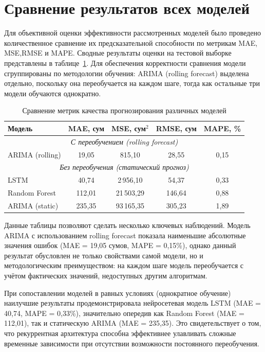 \section{Сравнение результатов всех моделей}
Для объективной оценки эффективности рассмотренных моделей было проведено количественное сравнение их предсказательной способности по метрикам MAE, MSE,RMSE и MAPE. Сводные результаты оценки на тестовой выборке представлены в таблице~\ref{tab:models_comparison}. Для обеспечения корректности сравнения модели сгруппированы по методологии обучения: ARIMA (rolling forecast) выделена отдельно, поскольку она переобучается на каждом шаге, тогда как остальные три модели обучаются однократно.
\begin{table}[h!]
\centering
\caption{Сравнение метрик качества прогнозирования различных моделей}
\label{tab:models_comparison}
\begin{tabular}{|l|c|c|c|c|}
\hline
\textbf{Модель} & \textbf{MAE, сум} & \textbf{MSE, сум$^2$} & \textbf{RMSE, сум} & \textbf{MAPE, \%} \\ \hline
\multicolumn{5}{|c|}{\textit{С переобучением (rolling forecast)}} \\ \hline
ARIMA (rolling) & 19{,}05 & 815{,}10 & 28{,}55 & 0{,}15 \\ \hline
\multicolumn{5}{|c|}{\textit{Без переобучения (статический прогноз)}} \\ \hline
LSTM            & 40{,}74 & 2\,956{,}10 & 54{,}37 & 0{,}33 \\ \hline
Random Forest   & 112{,}01 & 21\,503{,}29 & 146{,}64 & 0{,}88 \\ \hline
ARIMA (static)  & 235{,}35 & 93\,165{,}35 & 305{,}23 & 1{,}89 \\ \hline
\end{tabular}
\end{table}

Данные таблицы позволяют сделать несколько ключевых наблюдений. Модель ARIMA с использованием rolling forecast показала наименьшие абсолютные значения ошибок (MAE = 19,05 сумов, MAPE = 0,15\%), однако данный результат обусловлен не только свойствами самой модели, но и методологическим преимуществом: на каждом шаге модель переобучается с учётом фактических значений, недоступных другим алгоритмам.

При сопоставлении моделей в равных условиях (однократное обучение) наилучшие результаты продемонстрировала нейросетевая модель LSTM (MAE = 40,74, MAPE = 0,33\%), значительно опередив как Random Forest (MAE = 112,01), так и статическую ARIMA (MAE = 235,35). Это свидетельствует о том, что рекуррентная архитектура способна эффективнее улавливать сложные временные зависимости при отсутствии возможности постоянного переобучения.

